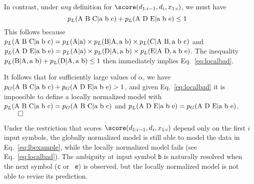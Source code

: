 In contrast, under {\em any} definition for $\score(d_{1:i-1}, d_i,
x_{1:i})$, we must have
\begin{equation}
p_L(\hbox{A B C} | \hbox{a b c}) + 
p_L(\hbox{A D E} | \hbox{a b e}) \leq 1
\label{eq:localbad}
\end{equation}
This follows because $p_L(\hbox{A B C} | \hbox{a b c})
= p_L(\hbox{A} | \hbox{a}) \times
p_L(\hbox{B} | \hbox{A}, \hbox{a b}) \times p_L(\hbox{C} | \hbox{A B},
\hbox{a b c})$
and $p_L(\hbox{A D E} | \hbox{a b e})
= p_L(\hbox{A} | \hbox{a}) \times
p_L(\hbox{D} | \hbox{A}, \hbox{a b}) \times
p_L(\hbox{E} | \hbox{A D}, \hbox{a b e})$.
The inequality $p_L(\hbox{B} | \hbox{A}, \hbox{a b}) + p_L(\hbox{D} |
\hbox{A}, \hbox{a b}) \leq 1$ then immediately implies
Eq.~\eqref{eq:localbad}.

It follows that for sufficiently large values of $\alpha$, we have 
$p_G(\hbox{A B C} | \hbox{a b c}) + p_G(\hbox{A D E} | \hbox{a b e}) >
1$, and given Eq.~\eqref{eq:localbad}
it is impossible to define a locally normalized
model with $p_L(\hbox{A B C} | \hbox{a b c}) = p_G(\hbox{A B C} |
\hbox{a b c})$ and $p_L(\hbox{A D E} | \hbox{a b e}) = 
p_G(\hbox{A D E} | \hbox{a b e})$.
$\qed$



Under the restriction that scores $\score(d_{1:i-1}, d_i, x_{1:i})$
depend only on the first $i$ input symbols,
the globally normalized model is still able to model the data in
Eq.~\eqref{eq:lbexample}, while the locally normalized model
fails (see Eq.~\ref{eq:localbad}). The ambiguity at input symbol
{\tt b} is naturally resolved when the next symbol ({\tt c} or {\tt
  e}) is observed, but the locally normalized model is not able to
revise its prediction.

